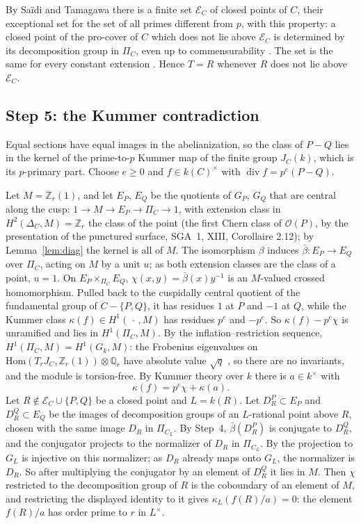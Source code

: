 \documentclass[11pt]{amsart}
\theoremstyle{remark}
\newcommand{\Z}{\mathbb Z}
\newcommand{\Q}{\mathbb Q}
\DeclareMathOperator{\divi}{div}
\begin{document}
By Sa\"idi and Tamagawa there is a finite set $\mathcal E_C$ of closed points of $C$, their exceptional set for the set of all primes different from $p$, with this property: a closed point of the pro-cover of $C$ which does not lie above $\mathcal E_C$ is determined by its decomposition group in $\Pi_C$, even up to commensurability \cite[Definitions 1.3, 1.5, 1.10, Proposition 1.8(vi)]{ST09}. The set is the same for every constant extension \cite[Remark 1.2]{ST09}. Hence $T=R$ whenever $R$ does not lie above $\mathcal E_C$.

\subsection{Step 5: the Kummer contradiction}
Equal sections have equal images in the abelianization, so the class of $P-Q$ lies in the kernel of the prime-to-$p$ Kummer map of the finite group $J_C(k)$, which is its $p$-primary part. Choose $e\ge0$ and $f\in k(C)^\times$ with $\divi f=p^e(P-Q)$.

Let $M=\Z_r(1)$, and let $E_P$, $E_Q$ be the quotients of $G_P$, $G_Q$ that are central along the cusp: $1\to M\to E_P\to\Pi_C\to1$, with extension class in $H^2(\Delta_C,M)=\Z_r$ the class of the point (the first Chern class of $\mathcal O(P)$, by the presentation of the punctured surface, SGA~1, XIII, Corollaire 2.12); by Lemma~\ref{lem:diag} the kernel is all of $M$. The isomorphism $\beta$ induces $\bar\beta\colon E_P\to E_Q$ over $\Pi_C$, acting on $M$ by a unit $u$; as both extension classes are the class of a point, $u=1$. On $E_P\times_{\Pi_C}E_Q$, $\chi(x,y)=\bar\beta(x)y^{-1}$ is an $M$-valued crossed homomorphism. Pulled back to the cuspidally central quotient of the fundamental group of $C-\{P,Q\}$, it has residues $1$ at $P$ and $-1$ at $Q$, while the Kummer class $\kappa(f)\in H^1(\,\cdot\,,M)$ has residues $p^e$ and $-p^e$. So $\kappa(f)-p^e\chi$ is unramified and lies in $H^1(\Pi_C,M)$. By the inflation--restriction sequence, $H^1(\Pi_C,M)=H^1(G_k,M)$: the Frobenius eigenvalues on $\mathrm{Hom}(T_rJ_C,\Z_r(1))\otimes\Q_r$ have absolute value $\sqrt q$ \cite[Th\'eor\`eme 1.6]{WeilI}, so there are no invariants, and the module is torsion-free. By Kummer theory over $k$ there is $a\in k^\times$ with
\[
 \kappa(f)=p^e\chi+\kappa(a).
\]
Let $R\notin\mathcal E_C\cup\{P,Q\}$ be a closed point and $L=k(R)$. Let $D_R^P\subset E_P$ and $D_R^Q\subset E_Q$ be the images of decomposition groups of an $L$-rational point above $R$, chosen with the same image $D_R$ in $\Pi_{C_L}$. By Step~4, $\bar\beta(D_R^P)$ is conjugate to $D_R^Q$, and the conjugator projects to the normalizer of $D_R$ in $\Pi_{C_L}$. By \cite[Lemma 1.7]{ST09} the projection to $G_L$ is injective on this normalizer; as $D_R$ already maps onto $G_L$, the normalizer is $D_R$. So after multiplying the conjugator by an element of $D_R^Q$ it lies in $M$. Then $\chi$ restricted to the decomposition group of $R$ is the coboundary of an element of $M$, and restricting the displayed identity to it gives $\kappa_L(f(R)/a)=0$: the element $f(R)/a$ has order prime to $r$ in $L^\times$.
\end{document}
